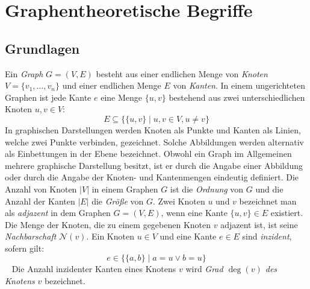 \section{Graphentheoretische Begriffe}
\vspace{-1mm}
\label{chap_prel}
\subsection{Grundlagen}
Ein \emph{Graph} $G = (V, E)$ besteht aus einer endlichen Menge von \emph{Knoten} $V = \{v_1 ,\ldots, v_n\}$ und einer endlichen Menge $E$ von \emph{Kanten}. In einem ungerichteten Graphen ist jede Kante $e$ eine Menge $\{u, v\}$ bestehend aus zwei unterschiedlichen Knoten $u, v \in V$:\vspace{-1mm}
$$E \subseteq \{\{u, v\}\; |\; u, v \in V, u \neq v\}$$
In graphischen Darstellungen werden Knoten als Punkte und Kanten als Linien, welche zwei Punkte verbinden, gezeichnet. Solche Abbildungen werden alternativ als Einbettungen in der Ebene bezeichnet. Obwohl ein Graph im Allgemeinen mehrere graphische Darstellung besitzt, ist er durch die Angabe einer Abbildung oder durch die Angabe der Knoten- und Kantenmengen eindeutig definiert.\vspace{-1mm}\newline\newline
Die Anzahl von Knoten $|V|$ in einem Graphen $G$ ist die \emph{Ordnung} von $G$ und die Anzahl der Kanten $|E|$ die \emph{Größe} von $G$. Zwei Knoten $u$ und $v$ bezeichnet man als \emph{adjazent} in dem Graphen $G=(V,E)$, wenn eine Kante $\{u, v\} \in E$ existiert.\\Die Menge der Knoten, die zu einem gegebenen Knoten $v$ adjazent ist, ist seine \emph{Nachbarschaft} $\mathcal{N}(v)$. Ein Knoten $u \in V$ und eine Kante $e \in E$ sind \emph{inzident}, sofern gilt: \vspace{-1mm} $$e \in \{\{a,b\}\;|\;a=u \vee b=u\}$$ \vspace{-4mm}~\linebreak
Die Anzahl inzidenter Kanten eines Knotens $v$ wird \emph{Grad $\deg(v)$ des Knotens} $v$ bezeichnet.\\
\vspace{-8mm}
